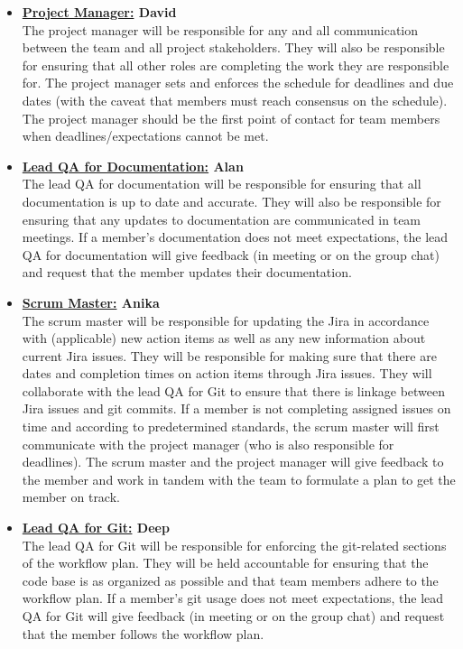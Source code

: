 \documentclass{article}
\begin{document}
\begin{itemize}
	\item \textbf{\underline{Project Manager:} David} \\
	The project manager will be responsible for any and all communication between the team and all project stakeholders. 
	They will also be responsible for ensuring that all other roles are completing the work they are responsible for. 
	The project manager sets and enforces the schedule for deadlines and due dates (with the caveat that members must reach consensus on the schedule). 
	The project manager should be the first point of contact for team members when deadlines/expectations cannot be met. 

	\item \textbf{\underline{Lead QA for Documentation:} Alan} \\
	The lead QA for documentation will be responsible for ensuring that all documentation is up to date and accurate.
	They will also be responsible for ensuring that any updates to documentation are communicated in team meetings.
	If a member's documentation does not meet expectations, the lead QA for documentation will give feedback (in meeting or on the group chat) 
	and request that the member updates their documentation.\\
	
	\item \textbf{\underline{Scrum Master:} Anika} \\
	The scrum master will be responsible for updating the Jira in accordance with (applicable) new action items 
	as well as any new information about current Jira issues. 
	They will be responsible for making sure that there are dates and completion times on action items through Jira issues. 
	They will collaborate with the lead QA for Git to ensure that there is linkage between Jira issues and git commits. 
	If a member is not completing assigned issues on time and according to predetermined standards, the scrum master will first 
	communicate with the project manager (who is also responsible for deadlines).
	The scrum master and the project manager will give feedback to the member and work in tandem 
	with the team to formulate a plan to get the member on track.\\

	\item \textbf{\underline{Lead QA for Git:} Deep} \\
	The lead QA for Git will be responsible for enforcing the git-related sections of the workflow plan. 
	They will be held accountable for ensuring that the code base is as organized as possible and that team members adhere to the workflow plan.
	If a member's git usage does not meet expectations, the lead QA for Git will give feedback (in meeting or on the group chat) and request that the member follows the workflow plan.\\


\end{itemize}
\end{document}
